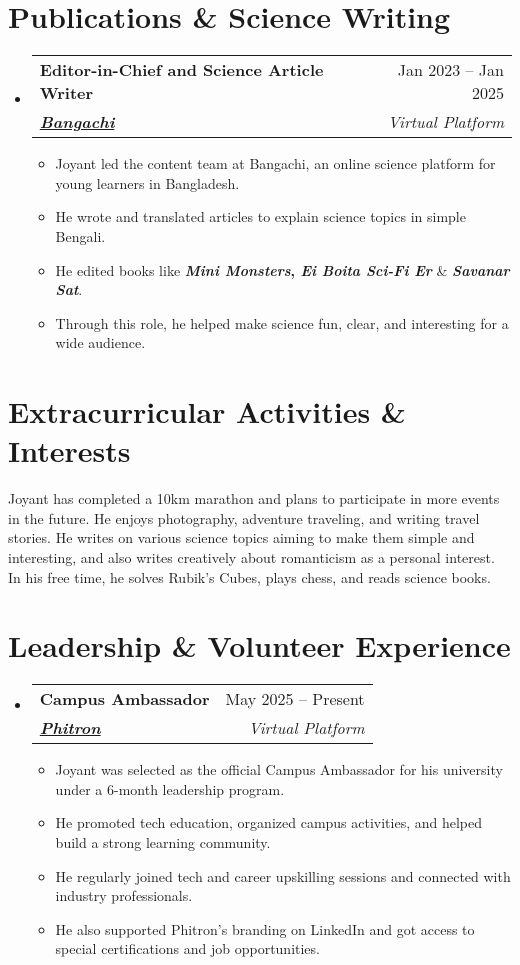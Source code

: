 \documentclass[a4paper, 11pt]{article}
\newcommand{\resumeItem}[1]{
  \item\small{
    {#1 \vspace{-2pt}}
  }
}
\newcommand{\resumeSubheading}[5]{
  \vspace{-2pt}\item
    \begin{tabularx}{\textwidth}[t]{X r}
      \textbf{#1} & #2 \\
      \textbf{\textit{\href{#3}{\small #4}}} & \textit{\small #5} \\
    \end{tabularx}\vspace{-7pt}
}
\newcommand{\resumeSubHeadingListStart}{\begin{itemize}[leftmargin=0in, label={}]}
\newcommand{\resumeSubHeadingListEnd}{\end{itemize}}
\newcommand{\resumeItemListStart}{\begin{itemize}}
\newcommand{\resumeItemListEnd}{\end{itemize}\vspace{-5pt}}
\begin{document}
\section{\textbf{Publications \& Science Writing}}
    \resumeSubHeadingListStart
        \resumeSubheading
            {Editor-in-Chief and Science Article Writer}{Jan 2023 -- Jan 2025}
            {https://bangachi.com/}{Bangachi}{Virtual Platform}
        \resumeItemListStart
            \resumeItem{Joyant led the content team at Bangachi, an online science platform for young learners in Bangladesh.}
            \resumeItem{He wrote and translated articles to explain science topics in simple Bengali.}
            \resumeItem{He edited books like \textbf{\textit{Mini Monsters}, \textit{Ei Boita Sci-Fi Er}} \& \textbf{\textit{Savanar Sat}}.}
            \resumeItem{Through this role, he helped make science fun, clear, and interesting for a wide audience.}
        \resumeItemListEnd
    \resumeSubHeadingListEnd

\section{\textbf{Extracurricular Activities \& Interests}}
    \small
    Joyant has completed a 10km marathon and plans to participate in more events in the future. He enjoys photography, adventure traveling, and writing travel stories. He writes on various science topics aiming to make them simple and interesting, and also writes creatively about romanticism as a personal interest. In his free time, he solves Rubik’s Cubes, plays chess, and reads science books.

\section{\textbf{Leadership \& Volunteer Experience}}
    \resumeSubHeadingListStart
        \resumeSubheading
            {Campus Ambassador}{May 2025 -- Present}
            {https://phitron.io/}{Phitron}{Virtual Platform}
        \resumeItemListStart
            \resumeItem{Joyant was selected as the official Campus Ambassador for his university under a 6-month leadership program.}
            \resumeItem{He promoted tech education, organized campus activities, and helped build a strong learning community.}
            \resumeItem{He regularly joined tech and career upskilling sessions and connected with industry professionals.}
            \resumeItem{He also supported Phitron’s branding on LinkedIn and got access to special certifications and job opportunities.}
        \resumeItemListEnd
    \resumeSubHeadingListEnd
\end{document}
